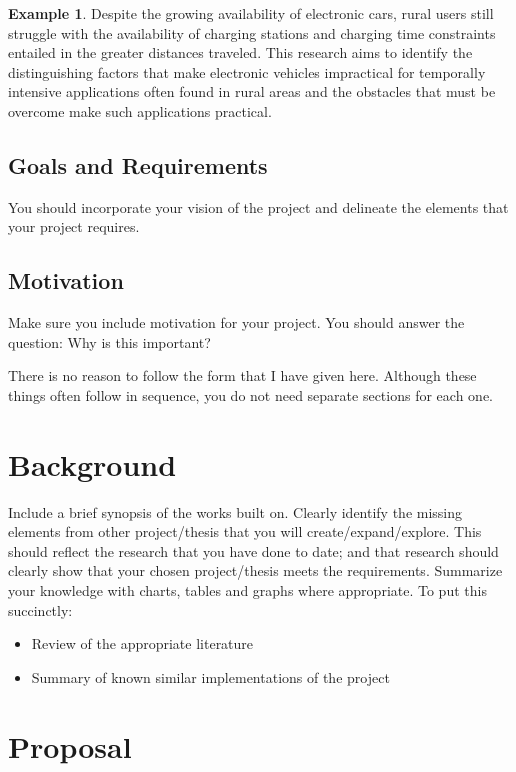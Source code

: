 \documentclass[ms,twoside,print]{nuthesis}
\theoremstyle{definition}
\newtheorem{example}{Example}[section]
\begin{document}
\begin{example}
  Despite the growing availability of electronic cars, rural users still struggle with the availability of charging stations and charging time constraints entailed in the greater distances traveled. This research aims to identify the distinguishing factors that make electronic vehicles impractical for temporally intensive applications often found in rural areas and the obstacles that must be overcome make such applications practical. 
\end{example}

\section{Goals and Requirements}

You should incorporate your vision of the project and delineate the elements that your project requires.

\section{Motivation}

Make sure you include motivation for your project. You should answer the question: Why is this important?

There is no reason to follow the form that I have given here. Although these things often follow in sequence, you do not need separate sections for each one. 
\chapter{Background}

Include a brief synopsis of the works built on. Clearly identify the missing elements from other project/thesis that you will create/expand/explore. This should reflect the research that you have done to date; and that research should clearly show that your chosen project/thesis meets the requirements. Summarize your knowledge with charts, tables and graphs where appropriate. To put this succinctly: 
\begin{itemize}
  \item Review of the appropriate literature
  \item Summary of known similar implementations of the project
\end{itemize}

\chapter{Proposal}
\end{document}
